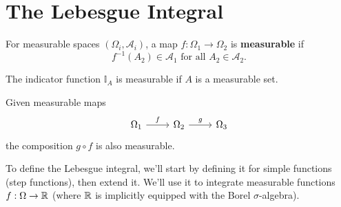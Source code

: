\documentclass[twoside,10pt]{article}
\begin{document}
\section{The Lebesgue Integral}

\begin{defn}[]
For measurable spaces $(\Omega_i,\mathcal{A}_{i})$, a map $f:\Omega_1\to \Omega_2$ is \textbf{measurable} if
\[
f^{-1}(A_2) \in \mathcal{A}_{1} \text{ for all } A_2 \in \mathcal{A}_{2}.
\]
\end{defn}

\begin{ex}[]
The indicator function $\mathbb{I}_{A}$ is measurable if $A$ is a measurable set.
\end{ex}

\begin{prop}
Given measurable maps
\[\begin{tikzcd}
	{\Omega_1} & {\Omega_2} & {\Omega_3}
	\arrow["f", from=1-1, to=1-2]
	\arrow["g", from=1-2, to=1-3]
\end{tikzcd}\]
the composition $g \circ f$ is also measurable.
\end{prop}

To define the Lebesgue integral, we'll start by defining it for simple functions (step functions), then extend it. We'll use it to integrate measurable functions $f:\Omega \to \mathbb{R}$ (where $\mathbb{R}$ is implicitly equipped with the Borel $\sigma$-algebra).
\end{document}

